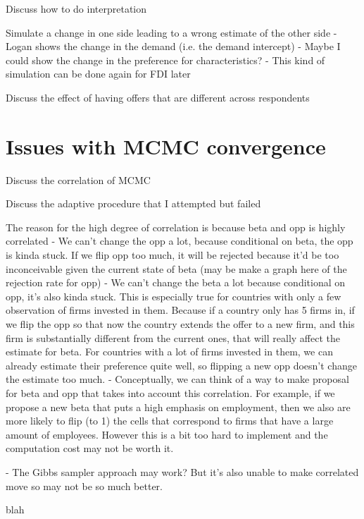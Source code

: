 Discuss how to do interpretation

Simulate a change in one side leading to a wrong estimate of the other side
- Logan shows the change in the demand (i.e. the demand intercept)
- Maybe I could show the change in the preference for characteristics?
- This kind of simulation can be done again for FDI later

Discuss the effect of having offers that are different across respondents

\section{Issues with MCMC convergence}
\label{sec:simulation_beta_opp_correlation}
Discuss the correlation of MCMC

Discuss the adaptive procedure that I attempted but failed

The reason for the high degree of correlation is because beta and opp is highly
correlated
- We can't change the opp a lot, because conditional on beta, the opp is kinda
stuck. If we flip opp too much, it will be rejected because it'd be too
inconceivable given the current state of beta (may be make a graph here of the
rejection rate for opp)
- We can't change the beta a lot because conditional on opp, it's also kinda
stuck. This is especially true for countries with only a few observation of
firms invested in them.
Because if a country only has 5 firms in, if we flip the opp so that now the
country extends the offer to a new firm, and this firm is substantially
different from the current ones, that will really affect the estimate for beta.
For countries with a lot of firms invested in them, we can already estimate
their preference quite well, so flipping a new opp doesn't change the estimate
too much.
- Conceptually, we can think of a way to make proposal for beta and opp that
takes into account this correlation. For example, if we propose a new beta that
puts a high emphasis on employment, then we also are more likely to flip (to 1)
the cells that correspond to firms that have a large amount of employees.
However this is a bit too hard to implement and the computation cost may not be
worth it.

- The Gibbs sampler approach may work? But it's also unable to make correlated
move so may not be so much better.

blah

